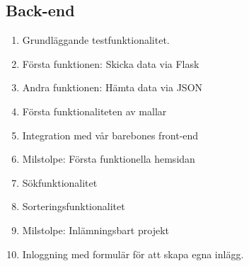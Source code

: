 \documentclass{TDP003mall}
\begin{document}
\subsection{Back-end}
\begin{enumerate}
\item Grundläggande testfunktionalitet.
\item Första funktionen: Skicka data via Flask
\item Andra funktionen: Hämta data via JSON
\item Första funktionaliteten av mallar
\item Integration med vår barebones front-end
\item Milstolpe: Första funktionella hemsidan
\item Sökfunktionalitet
\item Sorteringsfunktionalitet
\item Milstolpe: Inlämningsbart projekt
\item Inloggning med formulär för att skapa egna inlägg.
\end{enumerate}
\end{document}

